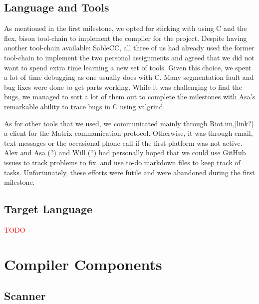 \documentclass{article}
\begin{document}
\subsection{Language and Tools}

As mentioned in the first milestone, we opted for sticking with using C and the flex, bison tool-chain to implement the compiler for the project. Despite having another tool-chain available: SableCC, all three of us had already used the former tool-chain to implement the two personal assignments and agreed that we did not want to spend extra time learning a new set of tools. Given this choice, we spent a lot of time debugging as one usually does with C. Many segmentation fault and bug fixes were done to get parts working. While it was challenging to find the bugs, we managed to sort a lot of them out to complete the milestones with Asa's remarkable ability to trace bugs in C using valgrind.

As for other tools that we used, we communicated mainly through Riot.im,[link?] a client for the Matrix communication protocol. Otherwise, it was through email, text messages or the occasional phone call if the first platform was not active. Alex and Asa (?) and Will (?) had personally hoped that we could use GitHub issues to track problems to fix, and use to-do markdown files to keep track of tasks. Unfortunately, these efforts were futile and were abandoned during the first milestone.

\subsection{Target Language}


\textcolor{red}{TODO}

\section{Compiler Components}


\subsection{Scanner}


\end{document}
